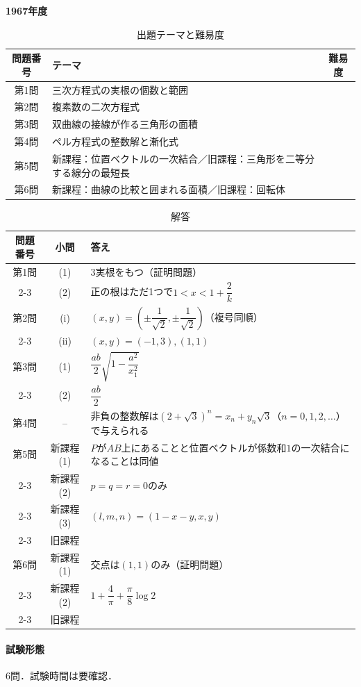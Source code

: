 \documentclass[../../main.tex]{subfiles}
\begin{document}
\begin{center}
  {\fontsize{48pt}{58pt}\selectfont \textbf{1967}\normalsize\textbf{年度}}
\end{center}

\begin{table}[htb]
  \centering
  \caption{出題テーマと難易度}
  \begin{tabular}{|c|p{9cm}|c|}
    \hline
    \textbf{問題番号} & \textbf{テーマ} & \textbf{難易度} \\
    \hline
    第1問 & 三次方程式の実根の個数と範囲 & \\
    \hline
    第2問 & 複素数の二次方程式 & \\
    \hline
    第3問 & 双曲線の接線が作る三角形の面積 & \\
    \hline
    第4問 & ペル方程式の整数解と漸化式 & \\
    \hline
    第5問 & 新課程：位置ベクトルの一次結合／旧課程：三角形を二等分する線分の最短長 & \\
    \hline
    第6問 & 新課程：曲線の比較と囲まれる面積／旧課程：回転体 & \\
    \hline
  \end{tabular}
\end{table}

\begin{table}[htb]
  \centering
  \caption{解答}
  \renewcommand{\arraystretch}{1.4}
  \begin{tabular}{|c|c|p{9cm}|}
    \hline
    \textbf{問題番号} & \textbf{小問} & \textbf{答え} \\
    \hline
    第1問 & (1) & 3実根をもつ（証明問題） \\
    \cline{2-3}
    & (2) & 正の根はただ1つで$1<x<1+\dfrac{2}{k}$ \\
    \hline
    第2問 & (i) & $(x,y)=\left(\pm\dfrac{1}{\sqrt{2}},\pm\dfrac{1}{\sqrt{2}}\right)$（複号同順） \\
    \cline{2-3}
    & (ii) & $(x,y)=(-1,3),(1,1)$ \\
    \hline
    第3問 & (1) & $\dfrac{ab}{2}\sqrt{1-\dfrac{a^2}{x_1^2}}$ \\
    \cline{2-3}
    & (2) & $\dfrac{ab}{2}$ \\
    \hline
    第4問 & -- & 非負の整数解は$(2+\sqrt{3})^n=x_n+y_n\sqrt{3}$（$n=0,1,2,\ldots$）で与えられる \\
    \hline
    第5問 & 新課程(1) & $P$が$AB$上にあることと位置ベクトルが係数和$1$の一次結合になることは同値 \\
    \cline{2-3}
    & 新課程(2) & $p=q=r=0$のみ \\
    \cline{2-3}
    & 新課程(3) & $(l,m,n)=(1-x-y,x,y)$ \\
    \cline{2-3}
    & 旧課程 &  \\
    \hline
    第6問 & 新課程(1) & 交点は$(1,1)$のみ（証明問題） \\
    \cline{2-3}
    & 新課程(2) & $1+\dfrac{4}{\pi}+\dfrac{\pi}{8}\log 2$ \\
    \cline{2-3}
    & 旧課程 &  \\
    \hline
  \end{tabular}
\end{table}

\paragraph{試験形態}
6問．試験時間は要確認．
\end{document}
